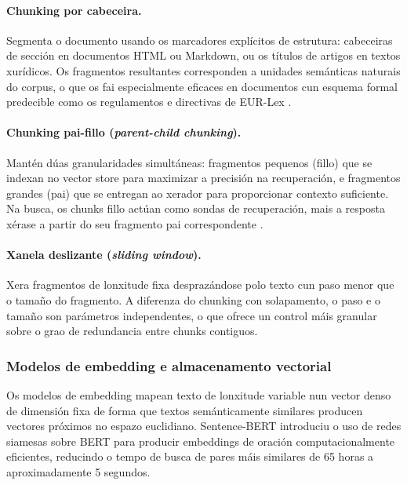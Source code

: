 \documentclass[11pt, a4paper, oneside]{report}
\begin{document}
\paragraph{Chunking por cabeceira.} Segmenta o documento usando os marcadores
explícitos de estrutura: cabeceiras de sección en documentos HTML ou Markdown, ou
os títulos de artigos en textos xurídicos. Os fragmentos resultantes corresponden a
unidades semánticas naturais do corpus, o que os fai especialmente eficaces en
documentos cun esquema formal predecible como os regulamentos e directivas de
EUR-Lex \citep{gao2023retrieval}.

\paragraph{Chunking pai-fillo (\textit{parent-child chunking}).} Mantén dúas
granularidades simultáneas: fragmentos pequenos (fillo) que se indexan no vector
store para maximizar a precisión na recuperación, e fragmentos grandes (pai) que se
entregan ao xerador para proporcionar contexto suficiente. Na busca, os chunks fillo
actúan como sondas de recuperación, mais a resposta xérase a partir do seu fragmento
pai correspondente \citep{langchain2022}.

\paragraph{Xanela deslizante (\textit{sliding window}).} Xera fragmentos de lonxitude
fixa desprazándose polo texto cun paso menor que o tamaño do fragmento. A diferenza do
chunking con solapamento, o paso e o tamaño son parámetros independentes, o que ofrece
un control máis granular sobre o grao de redundancia entre chunks contiguos.

\subsubsection{Modelos de embedding e almacenamento vectorial}
\label{sec:embeddings_teoria}

Os modelos de embedding mapean texto de lonxitude variable nun vector denso de dimensión
fixa de forma que textos semánticamente similares producen vectores próximos no espazo
euclidiano. Sentence-BERT \citep{reimers2019sentence} introduciu o uso de redes siamesas
sobre BERT para producir embeddings de oración computacionalmente eficientes, reducindo
o tempo de busca de pares máis similares de 65 horas a aproximadamente 5 segundos.
\end{document}
